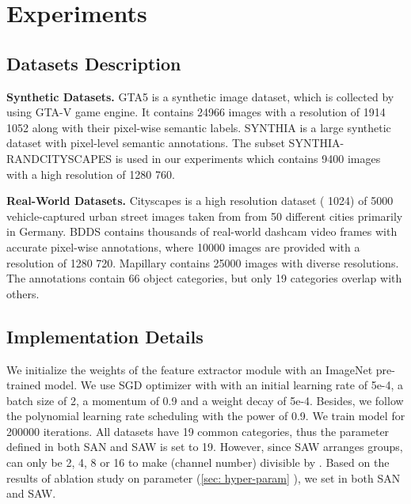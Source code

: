 \documentclass[10pt,twocolumn,letterpaper]{article}
\begin{document}
\section{Experiments}

\subsection{Datasets Description}
\textbf{Synthetic Datasets.} {GTA5} \cite{richter2016playing} is a synthetic image dataset, which is  collected by using  GTA-V game engine. It contains 24966 images with a resolution of 1914  1052 along with their pixel-wise semantic labels. 
{SYNTHIA} \cite{ros2016synthia} is a large synthetic dataset with pixel-level semantic annotations. The subset {SYNTHIA-RANDCITYSCAPES} \cite{ros2016synthia} is used in our experiments which contains 9400 images with a high resolution of 1280  760.

\textbf{Real-World Datasets.} {Cityscapes} \cite{cordts2016cityscapes} is a high resolution dataset (  1024) of 5000 vehicle-captured urban street images taken from from 50 different cities primarily in Germany. {BDDS} \cite{yu2018bdd100k} contains thousands of real-world dashcam video frames with accurate pixel-wise annotations, where 10000 images are provided with a resolution of 1280  720. {Mapillary} \cite{neuhold2017mapillary} contains 25000 images with diverse resolutions. The annotations contain 66 object categories, but only 19 categories overlap with others. 


\subsection{Implementation Details \label{implementation}}

We initialize the weights of the feature extractor module with an ImageNet \cite{deng2009imagenet} pre-trained model. We use SGD \cite{krizhevsky2012imagenet} optimizer with with an initial learning rate of 5e-4, a batch size of 2, a momentum of 0.9 and a weight decay of 5e-4. Besides, we follow the polynomial learning rate scheduling \cite{chen2017rethinking} with the power of 0.9. We train model for 200000 iterations. All datasets have 19 common categories, thus the parameter  defined in both SAN and SAW is set to 19. However, since SAW arranges  groups,  can only be 2, 4, 8 or 16 to make  (channel number) divisible by . Based on the results of ablation study on parameter  (\cref{sec: hyper-param}
), we set  in both SAN and SAW.
\end{document}
